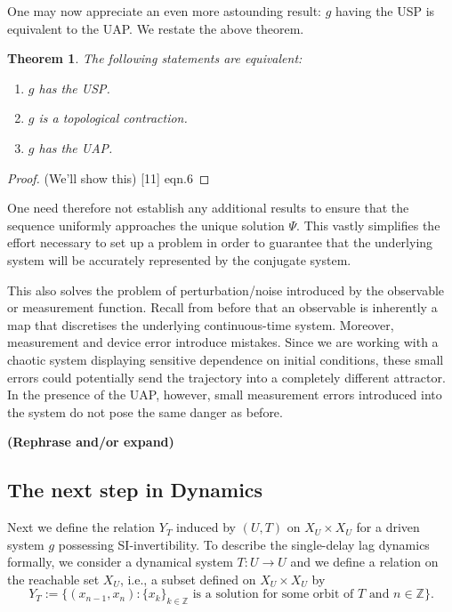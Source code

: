 \documentclass[12 pt]{article}
\newtheorem{Theorem}{Theorem}[]
\begin{document}
One may now appreciate an even more astounding result: $g$ having the USP is equivalent to the UAP. We restate the above theorem.

\begin{Theorem}
  The following statements are equivalent:
  \vspace{-8mm}
  \begin{enumerate}[noitemsep, label=\roman*.]
    \item $g$ has the USP.
    \item $g$ is a topological contraction.
    \item $g$ has the UAP.
  \end{enumerate}
\end{Theorem}
\begin{proof}
  (We'll show this)  [11] eqn.6 
\end{proof}

One need therefore not establish any additional results to ensure that the sequence uniformly approaches the unique solution $\Psi$. This vastly simplifies the effort necessary to set up a problem in order to guarantee that the underlying system will be accurately represented by the conjugate system.

This also solves the problem of perturbation/noise introduced by the observable or measurement function. Recall from before that an observable is inherently a map that discretises the underlying continuous-time system. Moreover, measurement and device error introduce mistakes. Since we are working with a chaotic system displaying sensitive dependence on initial conditions, these small errors could potentially send the trajectory into a completely different attractor. In the presence of the UAP, however, small measurement errors introduced into the system do not pose the same danger as before.

\textbf{(Rephrase and/or expand)}

\subsection{The next step in Dynamics}

Next we define the relation $Y_T$ induced by $(U,T)$ on $X_U\times{X_U}$ for a driven system $g$ possessing SI-invertibility.  To describe the  single-delay lag dynamics formally, we consider a dynamical system $T: U \to U$ and we define a relation on the reachable set $X_U$, i.e., a subset defined on $X_U \times X_U$ by 
$$Y_T:=\{(x_{n-1},x_n): \{x_k\}_{k\in \mathbb{Z}} \mbox{ is a solution for some orbit of } T \mbox{ and } n \in \mathbb{Z}\}.$$ 
\end{document}
